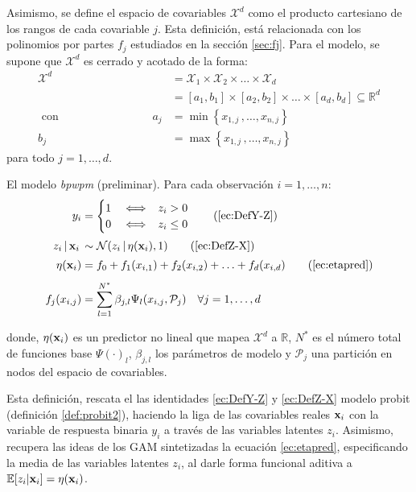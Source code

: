 \documentclass[../Main/Main.tex]{subfiles}
\begin{document}
Asimismo, se define el espacio de covariables $\mathcal{X}^d$ como el producto cartesiano de los rangos de cada covariable $j$. Esta definición, está relacionada con los polinomios por partes $f_j$ estudiados en la sección \ref{sec:fj}. Para el modelo, se supone que $\mathcal{X}^d$ es cerrado y acotado de la forma:
\begin{align*}
	\mathcal{X}^d &= \mathcal{X}_1\times\mathcal{X}_2\times\ldots\times\mathcal{X}_d\\
	&= [a_1,b_1]\times[a_2,b_2]\times\ldots\times[a_d,b_d] \subseteq \mathbb{R}^d \\ 
\text{ con }\qquad\qquad\qquad\qquad a_j &= \min\left\{x_{1,j}\, ,\ldots,x_{n,j}\right\} \\
	b_j &= \max\left\{x_{1,j}\, ,\ldots,x_{n,j}\right\}
\end{align*}
para todo $j = 1,\ldots,d$.\\

\begin{definition} \label{def:BPWPMPrelim}
El modelo \textit{bpwpm} (preliminar). Para cada observación $i = 1,\ldots,n$:
\begin{align}
y_i &= 
	\begin{cases}
		1 & \iff \enspace z_i > 0 \\									0 & \iff \enspace z_i \leq 0
	\end{cases} \tag{\ref{ec:DefY-Z}} \\[2pt]
z_i\,|\,\xni\, &\sim \mathcal{N}(z_i\,|\,\eta(\xni),1) \tag{\ref{ec:DefZ-X}} \\[2pt]
\eta(\xni) &= f_0 + f_1(x_{i,1}) + f_2(x_{i,2}) + \ldots + f_d(x_{i,d}) \tag{\ref{ec:etapred}} \\[4pt]
f_j(x_{i,j}) &= \sum_{l = 1}^{\N} \beta_{j,l} \Psi_l(x_{i,j}, \mathcal{P}_j) \quad \forall j = 1,\ldots,d \label{ec:fj}
\end{align}	
\end{definition}
donde, $\eta(\mathbf{x}_i)$ es un predictor no lineal que mapea $\mathcal{X}^d$ a $\mathbb{R}$, $N^*$ es el número total de funciones base $\Psi(\cdot)_l$, $\beta_{j,l}$ los parámetros de modelo y $\mathcal{P}_j$ una partición en nodos del espacio de covariables.

Esta definición, rescata el las identidades \eqref{ec:DefY-Z} y \eqref{ec:DefZ-X}  modelo probit (definición \ref{def:probit2}), haciendo la liga de las covariables reales $\mathbf{x}_i$ con la variable de respuesta binaria $y_i$ a través de las variables latentes $z_i$. Asimismo, recupera las ideas de los GAM sintetizadas la ecuación \eqref{ec:etapred}, especificando la media de las variables latentes $z_i$, al darle forma funcional aditiva a $\mathbb{E}[z_i|\mathbf{x}_i] = \eta(\mathbf{x}_i)$. 
\end{document}
